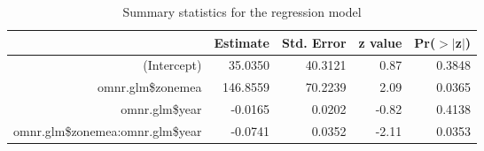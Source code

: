 \documentclass{article}
\begin{document}
\begin{spacing}{1.5}
\begin{center}
\begin{table}[ht]
\begin{center}
\begin{tabular}{rrrrr}
  \hline
 & Estimate & Std. Error & z value & Pr($>$$|$z$|$) \\ 
  \hline
(Intercept) & 35.0350 & 40.3121 & 0.87 & 0.3848 \\ 
  omnr.glm\$zonemea & 146.8559 & 70.2239 & 2.09 & 0.0365 \\ 
  omnr.glm\$year & -0.0165 & 0.0202 & -0.82 & 0.4138 \\ 
  omnr.glm\$zonemea:omnr.glm\$year & -0.0741 & 0.0352 & -2.11 & 0.0353 \\ 
   \hline
\end{tabular}
\caption{Summary statistics for the regression model}
\label{tab:summary}
\end{center}
\end{table}      \end{center}

\end{spacing}
\end{document}
